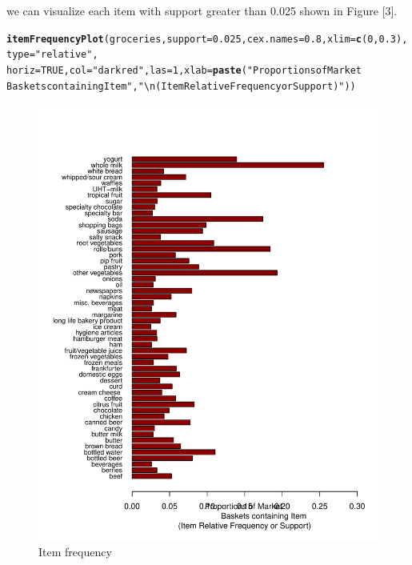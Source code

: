 \documentclass{article}\usepackage[]{graphicx}\usepackage[]{color}
\makeatletter
\def\maxwidth{ %
  \ifdim\Gin@nat@width>\linewidth
    \linewidth
  \else
    \Gin@nat@width
  \fi
}
\newcommand{\hlnum}[1]{\textcolor[rgb]{0.686,0.059,0.569}{#1}}%
\newcommand{\hlstr}[1]{\textcolor[rgb]{0.192,0.494,0.8}{#1}}%
\newcommand{\hlstd}[1]{\textcolor[rgb]{0.345,0.345,0.345}{#1}}%
\newcommand{\hlkwc}[1]{\textcolor[rgb]{0.333,0.667,0.333}{#1}}%
\newcommand{\hlkwd}[1]{\textcolor[rgb]{0.737,0.353,0.396}{\textbf{#1}}}%
\newenvironment{kframe}{%
 \def\at@end@of@kframe{}%
 \ifinner\ifhmode%
  \def\at@end@of@kframe{\end{minipage}}%
  \begin{minipage}{\columnwidth}%
 \fi\fi%
 \def\FrameCommand##1{\hskip\@totalleftmargin \hskip-\fboxsep
 \colorbox{shadecolor}{##1}\hskip-\fboxsep
     \hskip-\linewidth \hskip-\@totalleftmargin \hskip\columnwidth}%
 \MakeFramed {\advance\hsize-\width
   \@totalleftmargin\z@ \linewidth\hsize
   \@setminipage}}%
 {\par\unskip\endMakeFramed%
 \at@end@of@kframe}
\newenvironment{knitrout}{}{} %
\makeatother
\begin{document}
we can visualize each item with support greater than 0.025 shown in Figure [3].
\begin{knitrout}
\color{fgcolor}\begin{kframe}
\begin{alltt}
\hlkwd{itemFrequencyPlot}\hlstd{(groceries,}\hlkwc{support}\hlstd{=}\hlnum{0.025}\hlstd{,}\hlkwc{cex.names}\hlstd{=}\hlnum{0.8}\hlstd{,}\hlkwc{xlim}\hlstd{=}\hlkwd{c}\hlstd{(}\hlnum{0}\hlstd{,}\hlnum{0.3}\hlstd{),}\hlkwc{type}\hlstd{=}\hlstr{"relative"}\hlstd{,}
                  \hlkwc{horiz}\hlstd{=}\hlnum{TRUE}\hlstd{,}\hlkwc{col}\hlstd{=}\hlstr{"dark red"}\hlstd{,}\hlkwc{las}\hlstd{=}\hlnum{1}\hlstd{,}\hlkwc{xlab}\hlstd{=}\hlkwd{paste}\hlstd{(}\hlstr{"Proportions of Market 
                  Baskets containing Item"}\hlstd{,}\hlstr{"\textbackslash{}n(Item Relative Frequency or Support)"}\hlstd{))}
\end{alltt}
\end{kframe}\begin{figure}
\includegraphics[width=\maxwidth]{figure/unnamed-chunk-5-1} \caption[Item frequency]{Item frequency}\label{fig:unnamed-chunk-5}
\end{figure}


\end{knitrout}
\end{document}
